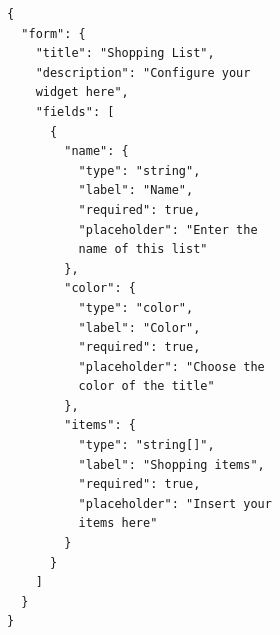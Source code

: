 \begin{minipage}{0.45\textwidth}
\begin{verbatim}
{
  "form": {
    "title": "Shopping List",
    "description": "Configure your 
    widget here",
    "fields": [
      {
        "name": {
          "type": "string",
          "label": "Name",
          "required": true,
          "placeholder": "Enter the 
          name of this list"
        },
        "color": {
          "type": "color",
          "label": "Color",
          "required": true,
          "placeholder": "Choose the 
          color of the title"
        },
        "items": {
          "type": "string[]",
          "label": "Shopping items",
          "required": true,
          "placeholder": "Insert your 
          items here"
        }
      }
    ]
  }
}
\end{verbatim}
\end{minipage}
\hfill
